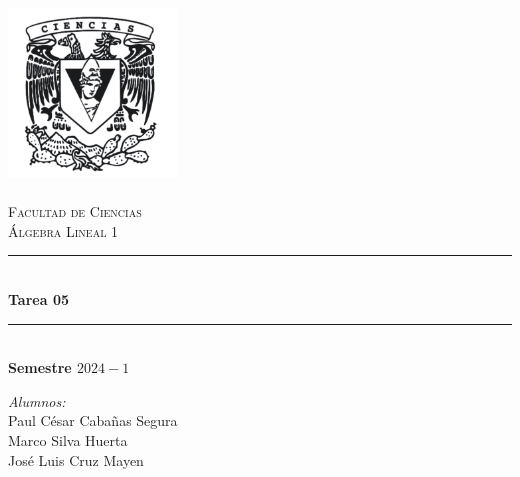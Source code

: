 \begin{titlepage}
\center %
\newcommand{\HRule}{\rule{\linewidth}{0.5mm}} 

\includegraphics[width=4.5cm]{IMA/Ciencias.png} \\ 
\quad \\[1.5cm]
\textsc{\Large Facultad de Ciencias}\\[0.5cm] %
\textsc{\Large Álgebra Lineal 1}\\[0.5cm] %
\makeatletter
    \HRule \\ [0.4cm]
        { \huge \bfseries Tarea 05}\\
    \HRule \\ [0.4cm]

\large\textbf{Semestre $2024-1$}\\

\vspace{5mm}
\begin{minipage}{0.4\textwidth}
    \begin{flushright} \large
    \centering
        \emph{Alumnos:} \\ %
        \vspace{4mm}
        Paul César Cabañas Segura\\
        \vspace{3mm}
        Marco Silva Huerta \\                
        \vspace{3mm}        
        José Luis Cruz Mayen
    \end{flushright}
\end{minipage}\\[1.5cm]


\end{titlepage}
